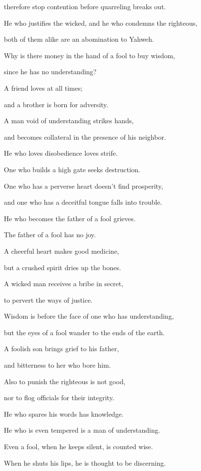 {\par }{\QB therefore stop contention before quarreling breaks out.
\par }{\Q {}He who justifies the wicked, and he who condemns the righteous,
\par }{\QB both of them alike are an abomination to Yahweh.
\par }{\Q {}Why is there money in the hand of a fool to buy wisdom,
\par }{\QB since he has no understanding?
\par }{\Q {}A friend loves at all times;
\par }{\QB and a brother is born for adversity.
\par }{\Q {}A man void of understanding strikes hands,
\par }{\QB and becomes collateral in the presence of his neighbor.
\par }{\Q {}He who loves disobedience loves strife.
\par }{\QB One who builds a high gate seeks destruction.
\par }{\Q {}One who has a perverse heart doesn’t find prosperity,
\par }{\QB and one who has a deceitful tongue falls into trouble.
\par }{\Q {}He who becomes the father of a fool grieves.
\par }{\QB The father of a fool has no joy.
\par }{\Q {}A cheerful heart makes good medicine,
\par }{\QB but a crushed spirit dries up the bones.
\par }{\Q {}A wicked man receives a bribe in secret,
\par }{\QB to pervert the ways of justice.
\par }{\Q {}Wisdom is before the face of one who has understanding,
\par }{\QB but the eyes of a fool wander to the ends of the earth.
\par }{\Q {}A foolish son brings grief to his father,
\par }{\QB and bitterness to her who bore him.
\par }{\Q {}Also to punish the righteous is not good,
\par }{\QB nor to flog officials for their integrity.
\par }{\Q {}He who spares his words has knowledge.
\par }{\QB He who is even tempered is a man of understanding.
\par }{\Q {}Even a fool, when he keeps silent, is counted wise.
\par }{\QB When he shuts his lips, he is thought to be discerning.

}
